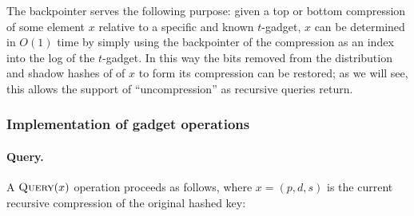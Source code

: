 \documentclass[letterpaper,11pt]{article}
\newcommand{\proc}[1]{\textnormal{\scshape#1}}
\begin{document}
The backpointer serves the following purpose: given a top or bottom
compression of some element $x$ relative to a specific and known
$t$-gadget, $x$ can be determined in $O(1)$ time by simply using the
backpointer of the compression as an index into the log of the
$t$-gadget. In this way the bits removed from the distribution and
shadow hashes of of $x$ to form its compression can be restored; as we
will see, this allows the support of ``uncompression'' as recursive
queries return.

\subsubsection{Implementation of gadget operations}\label{sec:recimp}



\paragraph{Query.}
A $\proc{Query}(x)$ operation proceeds as follows, where $x=(p,d,s)$
is the current recursive compression of the original hashed key:
\end{document}
